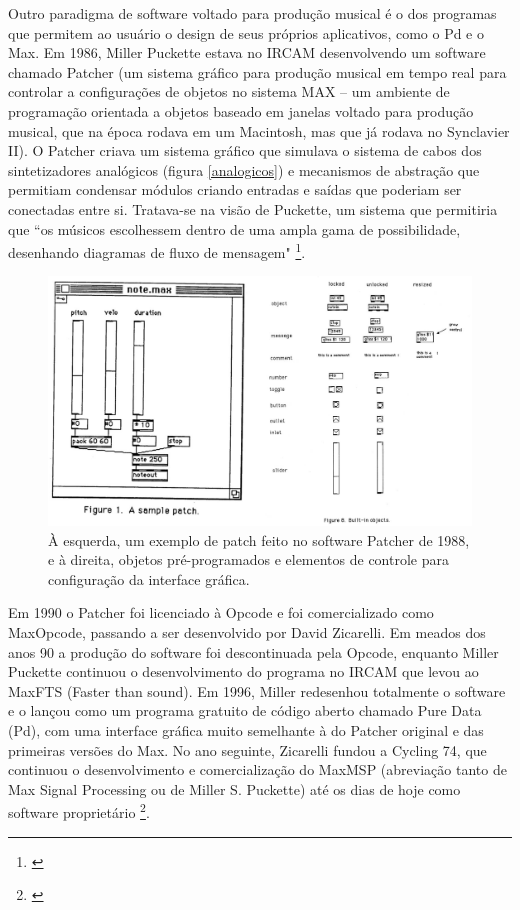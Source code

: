{\begin{figure}
\end{figure}

Outro paradigma de software voltado para produção musical é o dos programas que permitem ao usuário o design de seus próprios aplicativos, como o Pd e o Max. Em 1986, Miller Puckette estava no IRCAM desenvolvendo um software chamado Patcher (um sistema gráfico para produção musical em tempo real para controlar a configurações de objetos no sistema MAX – um ambiente de programação orientada a objetos baseado em janelas voltado para produção musical, que na época rodava em um Macintosh, mas que já rodava no Synclavier II). O Patcher criava um sistema gráfico que simulava o sistema de cabos dos sintetizadores analógicos (figura \ref{analogicos}) e mecanismos de abstração que permitiam condensar módulos criando entradas e saídas que poderiam ser conectadas entre si. Tratava-se na visão de Puckette, um sistema que permitiria que ``os músicos escolhessem dentro de uma ampla gama de possibilidade, desenhando diagramas de fluxo de mensagem" \footnote{\cite[5]{PucketteMiller}}. 

\begin{figure}
    \caption{\label{patcher}À esquerda, um exemplo de patch feito no software Patcher de 1988, e à direita, objetos pré-programados e elementos de controle para configuração da interface gráfica.}
    
        \includegraphics[width=1\linewidth]{pictures/cap2/patcher}
    
\end{figure}


Em 1990 o Patcher foi licenciado à Opcode e foi comercializado como Max\/Opcode, passando a ser desenvolvido por David Zicarelli. Em meados dos anos 90 a produção do software foi descontinuada pela Opcode, enquanto Miller Puckette continuou o desenvolvimento do programa no IRCAM que levou ao Max\/FTS (Faster than sound). Em 1996, Miller redesenhou totalmente o software e o lançou como um programa gratuito de código aberto chamado Pure Data (Pd), com uma interface gráfica muito semelhante à do Patcher original e das primeiras versões do Max. No ano seguinte, Zicarelli fundou a Cycling 74, que continuou o desenvolvimento e comercialização do Max\/MSP (abreviação tanto de Max Signal Processing ou de Miller S. Puckette) até os dias de hoje como software proprietário \footnote{\cite{Cryer2018}}.


}
